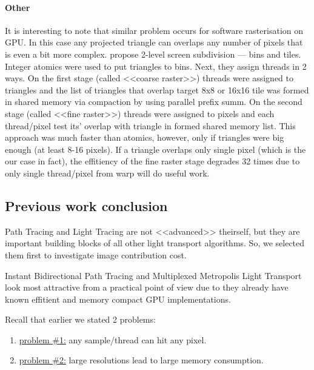\documentclass[twoside,twocolumn,10pt]{article}
\begin{document}
\paragraph{Other}

It is interesting to note that similar problem occurs for software rasterisation on GPU. In this case any projected triangle can overlaps any number of pixels that is even a bit more complex. \cite{Laine11} propose 2-level screen subdivision --- bins and tiles. Integer atomics were used to put triangles to bins. Next, they assign threads in 2 ways. On the first stage (called <<coarse raster>>) threads were assigned to triangles and the list of triangles that overlap target 8x8 or 16x16 tile was formed in shared memory via compaction by using parallel prefix summ. On the second stage (called <<fine raster>>) threads were assigned to pixels and each thread/pixel test its' overlap with triangle in formed shared memory list. This approach was much faster than atomics, however, only if triangles were big enough (at least 8-16 pixels). If a triangle overlaps only single pixel (which is the our case in fact), the effitiency of the fine raster stage degrades 32 times due to only single thread/pixel from warp will do useful work. 

\subsection*{Previous work conclusion}

Path Tracing and Light Tracing are not <<advanced>> theirself, but they are important building blocks of all other light transport algorithms. So, we selected them first to investigate image contribution cost.

Instant Bidirectional Path Tracing and Multiplexed Metropolis Light Transport look most attractive from a practical point of view due to they already have known effitient and memory compact GPU implementations.

Recall that earlier we stated 2 problems: 

\begin{enumerate}
	
\item \underline{problem \#1:} any sample/thread can hit any pixel. 

\item \underline{problem \#2:} large resolutions lead to large memory consumption.

\end{enumerate}
\end{document}
